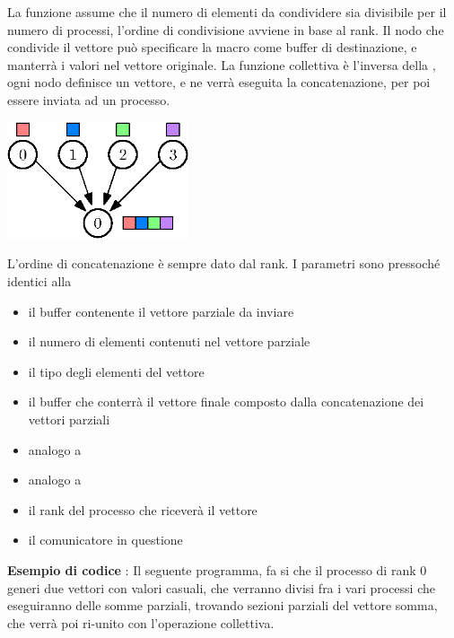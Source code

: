 \documentclass[10pt, letterpaper]{report}
\begin{document}
La funzione assume che il numero di elementi da condividere sia divisibile per il numero di processi, l'ordine 
di condivisione avviene in base al rank. Il nodo che condivide il vettore può specificare la macro 
 come buffer di destinazione, e manterrà i valori nel vettore originale.\acc 
La funzione collettiva  è l'inversa della , ogni nodo definisce un vettore, 
e ne verrà eseguita la concatenazione, per poi essere inviata ad un processo.\begin{center}
    \includegraphics[width=0.4\textwidth]{images/gather.eps}
\end{center}
L'ordine di concatenazione è sempre dato dal rank. I parametri sono pressoché identici alla \begin{itemize}
    \item {} il buffer contenente il vettore parziale da inviare
    \item  {} il numero di elementi contenuti nel vettore parziale
    \item  {} il tipo degli elementi del vettore 
    \item  {} il buffer che conterrà il vettore finale composto dalla concatenazione dei 
    vettori parziali 
    \item  {} analogo a 
    \item  {} analogo a 
    \item  {} il rank del processo che riceverà il vettore
    \item {} il comunicatore in questione
\end{itemize}
\textbf{Esempio di codice} : Il seguente programma, fa si che il processo di rank 0 generi 
due vettori con valori casuali, che verranno divisi fra i vari processi che eseguiranno delle somme parziali, 
trovando sezioni parziali del vettore somma, che verrà poi ri-unito con l'operazione collettiva.
\end{document}
